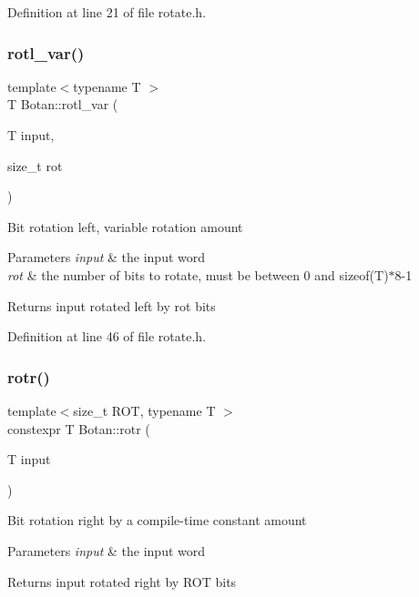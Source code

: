 Definition at line 21 of file rotate.\+h.

\mbox{\label{namespace_botan_a2e3ac5eb5fe20890242666142e72a8f6}} 
\subsubsection{\texorpdfstring{rotl\+\_\+var()}{rotl\_var()}}
{\footnotesize\ttfamily template$<$typename T $>$ \\
T Botan\+::rotl\+\_\+var (\begin{DoxyParamCaption}\item[{T}]{input,  }\item[{size\+\_\+t}]{rot }\end{DoxyParamCaption})\hspace{0.3cm}{\ttfamily [inline]}}

Bit rotation left, variable rotation amount 
\begin{DoxyParams}{Parameters}
{\em input} & the input word \\
\hline
{\em rot} & the number of bits to rotate, must be between 0 and sizeof(\+T)$\ast$8-\/1 \\
\hline
\end{DoxyParams}
\begin{DoxyReturn}{Returns}
input rotated left by rot bits 
\end{DoxyReturn}


Definition at line 46 of file rotate.\+h.

\mbox{\label{namespace_botan_ada30f39e9838317878d9da1e095bdfe8}} 
\subsubsection{\texorpdfstring{rotr()}{rotr()}}
{\footnotesize\ttfamily template$<$size\+\_\+t R\+OT, typename T $>$ \\
constexpr T Botan\+::rotr (\begin{DoxyParamCaption}\item[{T}]{input }\end{DoxyParamCaption})\hspace{0.3cm}{\ttfamily [inline]}}

Bit rotation right by a compile-\/time constant amount 
\begin{DoxyParams}{Parameters}
{\em input} & the input word \\
\hline
\end{DoxyParams}
\begin{DoxyReturn}{Returns}
input rotated right by R\+OT bits 
\end{DoxyReturn}


